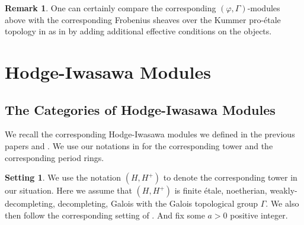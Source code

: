 \documentclass[12pt]{amsart}
\theoremstyle{definition}
\newtheorem{remark}[theorem]{Remark}
\numberwithin{equation}{section}
\newtheorem{setting}[theorem]{Setting}
\begin{document}
\begin{remark}
One can certainly compare the corresponding $(\varphi,\Gamma)$-modules above with the corresponding Frobenius sheaves over the Kummer pro-\'etale topology in \label{setting2.18} as in \cite{KL16} by adding additional effective conditions on the objects.
\end{remark}





















\newpage

\section{Hodge-Iwasawa Modules}


\subsection{The Categories of Hodge-Iwasawa Modules}


\noindent We recall the corresponding Hodge-Iwasawa modules we defined in the previous papers \cite{XT1} and \cite{XT2}. We use our notations in \cite{XT2} for the corresponding tower and the corresponding period rings.


\begin{setting}
We use the notation $(H,H^+)$ to denote the corresponding tower in our situation. Here we assume that $(H,H^+)$ is finite \'etale, noetherian, weakly-decompleting, decompleting, Galois with the Galois topological group $\Gamma$. We also then follow the corresponding setting of \cite[Hypothesis 3.1.1]{KL16}. And fix some $a>0$ positive integer.	
\end{setting}
\end{document}
